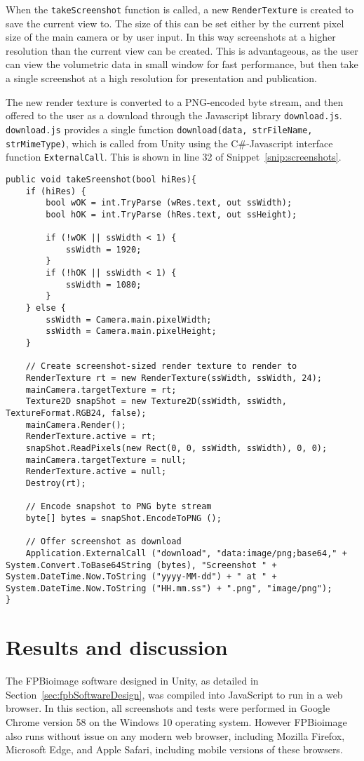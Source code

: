 When the \texttt{takeScreenshot} function is called, a new \texttt{RenderTexture} is created to save the current view to.
The size of this can be set either by the current pixel size of the main camera or by user input.
In this way screenshots at a higher resolution than the current view can be created.
This is advantageous, as the user can view the volumetric data in small window for fast performance, but then take a single screenshot at a high resolution for presentation and publication.

The new render texture is converted to a PNG-encoded byte stream, and then offered to the user as a download through the Javascript library \texttt{download.js}.
\texttt{download.js} provides a single function \texttt{download(data, strFileName, strMimeType)}, which is called from Unity using the C\#-Javascript interface function \texttt{ExternalCall}.
This is shown in line 32 of Snippet~\ref{snip:screenshots}.

\begin{lstlisting}[language={[Sharp]c}, label={snip:screenshots}, caption={C\# code for capturing a high-resolution screenshot and presenting it to the user as a download.}]
public void takeSreenshot(bool hiRes){
	if (hiRes) {
		bool wOK = int.TryParse (wRes.text, out ssWidth);
		bool hOK = int.TryParse (hRes.text, out ssHeight);

		if (!wOK || ssWidth < 1) {
			ssWidth = 1920;
		}
		if (!hOK || ssWidth < 1) {
			ssWidth = 1080;
		}
	} else {
		ssWidth = Camera.main.pixelWidth;
		ssWidth = Camera.main.pixelHeight;
	}

	// Create screenshot-sized render texture to render to
	RenderTexture rt = new RenderTexture(ssWidth, ssWidth, 24);
	mainCamera.targetTexture = rt;
	Texture2D snapShot = new Texture2D(ssWidth, ssWidth, TextureFormat.RGB24, false);
	mainCamera.Render();
	RenderTexture.active = rt;
	snapShot.ReadPixels(new Rect(0, 0, ssWidth, ssWidth), 0, 0);
	mainCamera.targetTexture = null;
	RenderTexture.active = null;
	Destroy(rt);

	// Encode snapshot to PNG byte stream
	byte[] bytes = snapShot.EncodeToPNG ();

	// Offer screenshot as download
	Application.ExternalCall ("download", "data:image/png;base64," + System.Convert.ToBase64String (bytes), "Screenshot " + System.DateTime.Now.ToString ("yyyy-MM-dd") + " at " + System.DateTime.Now.ToString ("HH.mm.ss") + ".png", "image/png");
}
\end{lstlisting}

\section{Results and discussion} \label{sec:fpbResults}
The FPBioimage software designed in Unity, as detailed in Section~\ref{sec:fpbSoftwareDesign}, was compiled into JavaScript to run in a web browser.
In this section, all screenshots and tests were performed in Google Chrome version 58 on the Windows 10 operating system.
However FPBioimage also runs without issue on any modern web browser, including Mozilla Firefox, Microsoft Edge, and Apple Safari, including mobile versions of these browsers.


